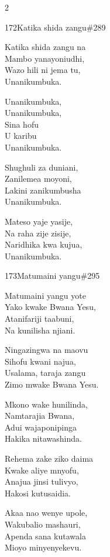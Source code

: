 \documentclass{article}
\begin{document}
\begin{multicols}{2}
\begin{hymn}{172}{Katika shida zangu}{\#289}
\begin{stanza}
Katika shida zangu na\\
Mambo yanayoniudhi,\\
Wazo hili ni jema tu,\\
Unanikumbuka.
\end{stanza}
\begin{chorus}
Unanikumbuka,\\
Unanikumbuka,\\
Sina hofu\\
U karibu\\
Unanikumbuka.
\end{chorus}
\begin{stanza}
Shughuli za duniani,\\
Zanilemea moyoni,\\
Lakini zanikumbusha\\
Unanikumbuka.
\end{stanza}
\begin{stanza}
Mateso yaje yasije,\\
Na raha zije zisije,\\
Naridhika kwa kujua,\\
Unanikumbuka.
\end{stanza}
\end{hymn}

\begin{hymn}{173}{Matumaini yangu}{\#295}
\begin{stanza}
Matumaini yangu yote\\
Yako kwake Bwana Yesu,\\
Atanifariji taabuni,\\
Na kunilisha njiani.
\end{stanza}
\begin{chorus}
Ningazingwa na maovu\\
Sihofu kwani najua,\\
Usalama, taraja zangu\\
Zimo mwake Bwana Yesu.
\end{chorus}
\begin{stanza}
Mkono wake hunilinda,\\
Namtarajia Bwana,\\
Adui wajaponipinga\\
Hakika nitawashinda.
\end{stanza}
\begin{stanza}
Rehema zake ziko daima\\
Kwake aliye mnyofu,\\
Anajua jinsi tulivyo,\\
Hakosi kutusaidia.
\end{stanza}
\begin{stanza}
Akaa nao wenye upole,\\
Wakubalio mashauri,\\
Apenda sana kutawala\\
Mioyo minyenyekevu.
\end{stanza}
\end{hymn}


\end{multicols}
\end{document}
